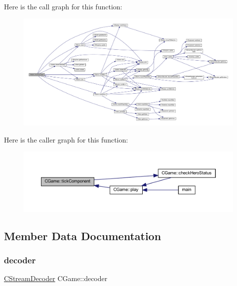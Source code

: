 Here is the call graph for this function\+:\nopagebreak
\begin{figure}[H]
\begin{center}
\leavevmode
\includegraphics[width=350pt]{class_c_game_a714b291af5e20aae8be14a905fd0522d_cgraph}
\end{center}
\end{figure}
Here is the caller graph for this function\+:\nopagebreak
\begin{figure}[H]
\begin{center}
\leavevmode
\includegraphics[width=350pt]{class_c_game_a714b291af5e20aae8be14a905fd0522d_icgraph}
\end{center}
\end{figure}


\subsection{Member Data Documentation}
\mbox{\label{class_c_game_aea418660907ae3c1940cc2a664f679f3}} 
\subsubsection{\texorpdfstring{decoder}{decoder}}
{\footnotesize\ttfamily \mbox{\hyperlink{class_c_stream_decoder}{C\+Stream\+Decoder}} C\+Game\+::decoder\hspace{0.3cm}{\ttfamily [protected]}}

